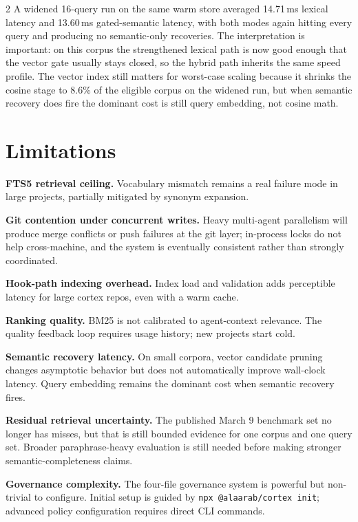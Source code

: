 \documentclass[10pt]{article}
\begin{document}
\begin{multicols}{2}
A widened 16-query run on the same warm store averaged 14.71\,ms lexical latency and 13.60\,ms gated-semantic latency, with both modes again hitting every query and producing no semantic-only recoveries. The interpretation is important: on this corpus the strengthened lexical path is now good enough that the vector gate usually stays closed, so the hybrid path inherits the same speed profile. The vector index still matters for worst-case scaling because it shrinks the cosine stage to 8.6\% of the eligible corpus on the widened run, but when semantic recovery does fire the dominant cost is still query embedding, not cosine math.

\section{Limitations}
\label{sec:limitations}

\textbf{FTS5 retrieval ceiling.} Vocabulary mismatch remains a real failure mode in large projects, partially mitigated by synonym expansion.

\textbf{Git contention under concurrent writes.} Heavy multi-agent parallelism will produce merge conflicts or push failures at the git layer; in-process locks do not help cross-machine, and the system is eventually consistent rather than strongly coordinated.

\textbf{Hook-path indexing overhead.} Index load and validation adds perceptible latency for large cortex repos, even with a warm cache.

\textbf{Ranking quality.} BM25 is not calibrated to agent-context relevance. The quality feedback loop requires usage history; new projects start cold.

\textbf{Semantic recovery latency.} On small corpora, vector candidate pruning changes asymptotic behavior but does not automatically improve wall-clock latency. Query embedding remains the dominant cost when semantic recovery fires.

\textbf{Residual retrieval uncertainty.} The published March 9 benchmark set no longer has misses, but that is still bounded evidence for one corpus and one query set. Broader paraphrase-heavy evaluation is still needed before making stronger semantic-completeness claims.

\textbf{Governance complexity.} The four-file governance system is powerful but non-trivial to configure. Initial setup is guided by \texttt{npx @alaarab/cortex init}; advanced policy configuration requires direct CLI commands.


\end{multicols}
\end{document}
